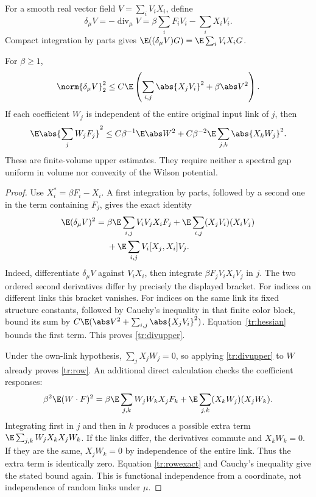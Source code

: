 For a smooth real vector field \(V=\sum_iV_iX_i\), define
\[
 \delta_\mu V=-\operatorname{div}_\mu V
   =\beta\sum_iF_iV_i-\sum_iX_iV_i.
\]
Compact integration by parts gives
\(\E((\delta_\mu V)G)=\E\sum_iV_iX_iG\).

\begin{lemma}
\label{tr:divergence}
For \(\beta\ge1\),
\begin{equation}
 \norm{\delta_\mu V}_2^2
 \le C\E\left(\sum_{i,j}\abs{X_jV_i}^2+\beta\abs V^2\right).
 \label{tr:divupper}
\end{equation}
If each coefficient \(W_j\) is independent of the entire original input link
of \(j\), then
\begin{equation}
 \E\abs{\sum_jW_jF_j}^2
 \le C\beta^{-1}\E\abs W^2
       +C\beta^{-2}\E\sum_{j,k}\abs{X_kW_j}^2.
 \label{tr:row}
\end{equation}
These are finite-volume upper estimates. They require neither a spectral gap
uniform in volume nor convexity of the Wilson potential.
\end{lemma}

\begin{proof}
Use \(X_i^*=\beta F_i-X_i\). A first integration by parts, followed by a
second one in the term containing \(F_j\), gives the exact identity
\begin{align}
 \E(\delta_\mu V)^2
 ={}&\beta\E\sum_{i,j}V_iV_jX_iF_j
    +\E\sum_{i,j}(X_jV_i)(X_iV_j)\notag\\
   &+\E\sum_{i,j}V_i[X_j,X_i]V_j.
 \label{tr:dividentity}
\end{align}
Indeed, differentiate \(\delta_\mu V\) against \(V_iX_i\), then integrate
\(\beta F_jV_iX_iV_j\) in \(j\). The two ordered second derivatives differ
by precisely the displayed bracket. For indices on different links this
bracket vanishes. For indices on the same link its fixed structure constants,
followed by Cauchy's inequality in that finite color block, bound its sum by
\(C\E(\abs V^2+\sum_{i,j}\abs{X_jV_i}^2)\).
Equation~\eqref{tr:hessian} bounds the first term. This proves
\eqref{tr:divupper}.

Under the own-link hypothesis, \(\sum_jX_jW_j=0\), so applying
\eqref{tr:divupper} to \(W\) already proves \eqref{tr:row}. An additional
direct calculation checks the coefficient responses:
\begin{equation}
 \beta^2\E(W\cdot F)^2
 =\beta\E\sum_{j,k}W_jW_kX_jF_k
       +\E\sum_{j,k}(X_kW_j)(X_jW_k).
 \label{tr:rowexact}
\end{equation}
Integrating first in \(j\) and then in \(k\) produces a possible extra term
\(\E\sum_{j,k}W_jX_kX_jW_k\). If the links differ, the derivatives commute
and \(X_kW_k=0\). If they are the same, \(X_jW_k=0\) by independence of the
entire link. Thus the extra term is identically zero. Equation
\eqref{tr:rowexact} and Cauchy's inequality give the stated bound again.
This is functional independence from a coordinate, not independence of random
links under \(\mu\).
\end{proof}

